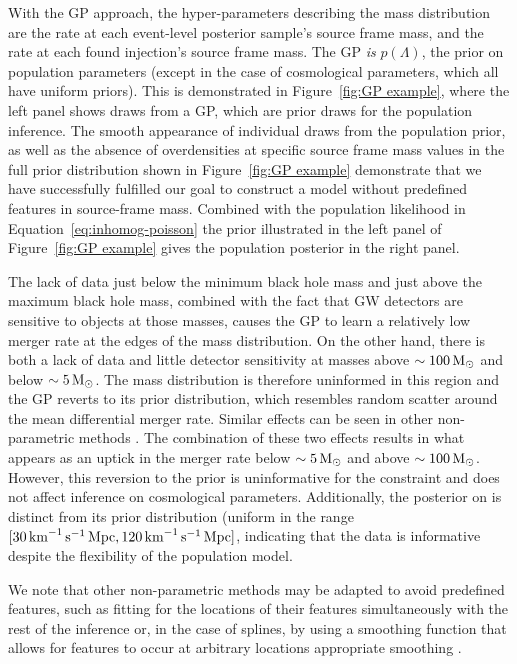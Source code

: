 \documentclass[preprint2,linenumbers]{aastex631}
\begin{document}
With the \ac{GP} approach, the hyper-parameters describing the mass distribution are the rate at each event-level posterior sample's source frame mass, and the rate at each found injection's source frame mass.
The \ac{GP} \emph{is} $p(\Lambda)$, the prior on population parameters (except in the case of cosmological parameters, which all have uniform priors).
This is demonstrated in Figure~\ref{fig:GP example}, where the left panel shows draws from a \ac{GP}, which are prior draws for the population inference.
The smooth appearance of individual draws from the population prior, as well as the absence of overdensities at specific source frame mass values in the full prior distribution shown in Figure~\ref{fig:GP example} demonstrate that we have successfully fulfilled our goal to construct a model without predefined features in source-frame mass.
Combined with the population likelihood in Equation~\ref{eq:inhomog-poisson} the prior illustrated in the left panel of Figure~\ref{fig:GP example} gives the population posterior in the right panel.

The lack of data just below the minimum black hole mass and just above the maximum black hole mass, combined with the fact that \ac{GW} detectors are sensitive to objects at those masses, causes the \ac{GP} to learn a relatively low merger rate at the edges of the mass distribution. 
On the other hand, there is both a lack of data and little detector sensitivity at masses above $\sim100\,\text{M}_{\odot}$ and below $\sim5\,\text{M}_{\odot}$.
The mass distribution is therefore uninformed in this region and the \ac{GP} reverts to its prior distribution, which resembles random scatter around the mean differential merger rate.
Similar effects can be seen in other non-parametric methods \citep{edelman_cover_2023, callister_parameter-free_2023}.
The combination of these two effects results in what appears as an uptick in the merger rate below $\sim5\,\text{M}_{\odot}$ and above $\sim100\,\text{M}_{\odot}$.
However, this reversion to the prior is uninformative for the \Ho{} constraint and does not affect inference on cosmological parameters.
Additionally, the posterior on \Ho{} is distinct from its prior distribution (uniform in the range $[30\,\text{km}^{-1}\,\text{s}^{-1}\,\text{Mpc},120\,\text{km}^{-1}\,\text{s}^{-1}\,\text{Mpc}]$, indicating that the data is informative despite the flexibility of the population model.

We note that other non-parametric methods may be adapted to avoid predefined features, such as fitting for the locations of their features simultaneously with the rest of the inference \citep[e.g.][]{tiwari_vamana_2021} or, in the case of splines, by using a smoothing function that allows for features to occur at arbitrary locations appropriate smoothing \citep[e.g.][]{edelman_cover_2023}. 
\end{document}
